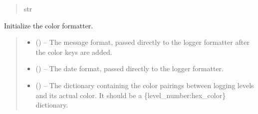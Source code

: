 \documentclass[letterpaper,11pt,english]{sphinxmanual}
\begin{document}
\begin{savenotes}
\begin{fulllineitems}
\begin{savenotes}
\begin{fulllineitems}
\begin{quote}
\begin{description}
\sphinxAtStartPar
str

\end{description}\end{quote}

\end{fulllineitems}\end{savenotes}


\begin{savenotes}\begin{fulllineitems}
\label{\detokenize{code/lezargus.library.logging:lezargus.library.logging.ColoredLogFormatter.__init__}}
\pysigstartsignatures
{}
\pysigstopsignatures
\sphinxAtStartPar
Initialize the color formatter.
\begin{quote}\begin{description}
\begin{itemize}
\item {} 
\sphinxAtStartPar
{} () – The message format, passed directly to the logger formatter after
the color keys are added.

\item {} 
\sphinxAtStartPar
{} () – The date format, passed directly to the logger formatter.

\item {} 
\sphinxAtStartPar
{} (\sphinxstyleliteralemphasis{\sphinxupquote{, }}) – The dictionary containing the color pairings between logging
levels and its actual color. It should be a
\{level\_number:hex\_color\} dictionary.

\end{itemize}


\end{description}
\end{quote}
\end{fulllineitems}
\end{savenotes}
\end{fulllineitems}
\end{savenotes}
\end{document}
